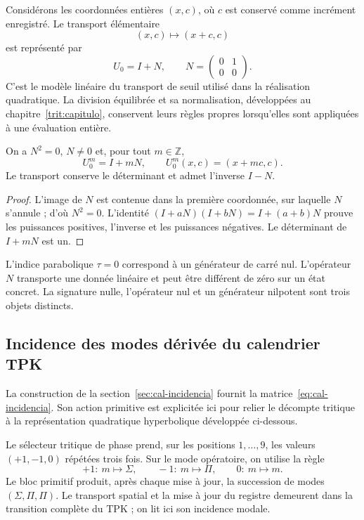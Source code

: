 Considérons les coordonnées entières \((x,c)\), où \(c\) est conservé
comme incrément enregistré. Le transport élémentaire
\[
 (x,c)\longmapsto(x+c,c)
\]
est représenté par
\[
 U_0=I+N,
 \qquad N=\begin{pmatrix}0&1\\0&0\end{pmatrix}.
\]
C’est le modèle linéaire du transport de seuil utilisé dans la
réalisation quadratique. La division équilibrée et sa normalisation,
développées au chapitre~\ref{trit:capitulo}, conservent leurs règles
propres lorsqu’elles sont appliquées à une évaluation entière.

\begin{proposicion}
\label{eul:prop:parabolico}
On a \(N^2=0\), \(N\ne0\) et, pour tout \(m\in\mathbb Z\),
\[
 U_0^m=I+mN,
 \qquad U_0^m(x,c)=(x+mc,c).
\]
Le transport conserve le déterminant et admet l’inverse \(I-N\).
\end{proposicion}
\begin{proof}
L’image de \(N\) est contenue dans la première coordonnée, sur laquelle
\(N\) s’annule ; d’où \(N^2=0\). L’identité
\((I+aN)(I+bN)=I+(a+b)N\) prouve les puissances positives, l’inverse et
les puissances négatives. Le déterminant de \(I+mN\) est un.
\end{proof}

L’indice parabolique \(\tau=0\) correspond à un générateur de carré
nul. L’opérateur \(N\) transporte une donnée linéaire et peut être différent
de zéro sur un état concret. La signature nulle, l’opérateur nul et un
générateur nilpotent sont trois objets distincts.

\subsection{Incidence des modes dérivée du calendrier TPK}
\label{eul:incidencia-modos}

La construction de la section~\ref{sec:cal-incidencia} fournit
la matrice~\eqref{eq:cal-incidencia}. Son action primitive est explicitée ici
pour relier le décompte tritique à la représentation quadratique
hyperbolique développée ci-dessous.

Le sélecteur tritique de phase prend, sur les positions \(1,\ldots,9\),
les valeurs \((+1,-1,0)\) répétées trois fois. Sur le mode opératoire,
on utilise la règle
\[
 +1:\ m\mapsto\Sigma,\qquad
 -1:\ m\mapsto\Pi,\qquad
 0:\ m\mapsto m.
\]
Le bloc primitif produit, après chaque mise à jour, la succession
de modes \((\Sigma,\Pi,\Pi)\). Le transport spatial et la mise à jour
du registre demeurent dans la transition complète du TPK ; on lit ici
son incidence modale.


